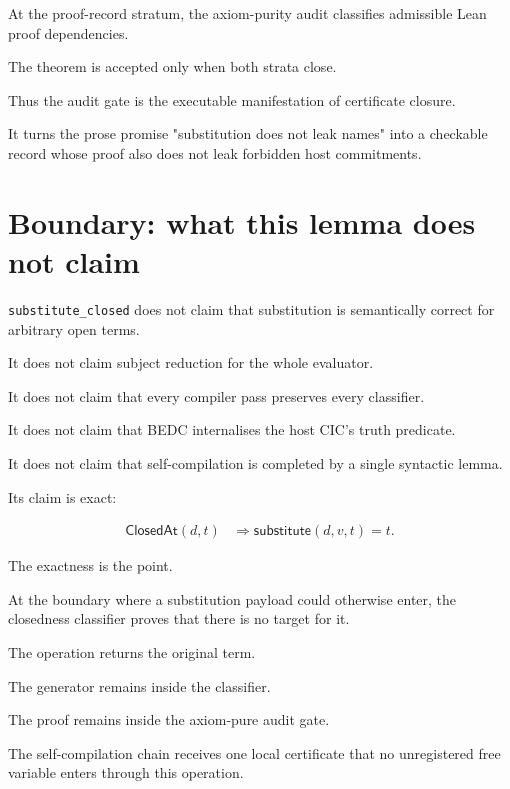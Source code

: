 At the proof-record stratum, the axiom-purity audit classifies admissible Lean
proof dependencies.

The theorem is accepted only when both strata close.

Thus the audit gate is the executable manifestation of certificate closure.

It turns the prose promise "substitution does not leak names" into a checkable
record whose proof also does not leak forbidden host commitments.

\section{Boundary: what this lemma does not claim}
\label{sec:closed-term-substitution-boundary}

\texttt{substitute\_closed} does not claim that substitution is semantically
correct for arbitrary open terms.

It does not claim subject reduction for the whole evaluator.

It does not claim that every compiler pass preserves every classifier.

It does not claim that BEDC internalises the host CIC's truth predicate.

It does not claim that self-compilation is completed by a single syntactic
lemma.

Its claim is exact:

$$
\begin{aligned}
  \mathsf{ClosedAt}(d,t)
  &\Rightarrow
  \mathsf{substitute}(d,v,t)=t.
\end{aligned}
$$

The exactness is the point.


At the boundary where a substitution payload could otherwise enter, the
closedness classifier proves that there is no target for it.

The operation returns the original term.

The generator remains inside the classifier.

The proof remains inside the axiom-pure audit gate.

The self-compilation chain receives one local certificate that no unregistered
free variable enters through this operation.

